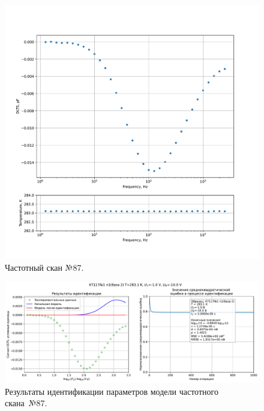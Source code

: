 \begin{figure}[!ht]
    \centering
    \includegraphics[width=1\textwidth]{../plots/КТ117№1_п1(база 2)_2500Гц-1Гц_1пФ_+10С_-1В-10В_200мВ_20мкс_шаг_0,1.pdf}
    \caption{Частотный скан №87.}
    \label{pic:frequency_scan_87}
\end{figure}

\begin{figure}[!ht]
    \centering
    \includegraphics[width=1\textwidth]{../plots/КТ117№1_п1(база 2)_2500Гц-1Гц_1пФ_+10С_-1В-10В_200мВ_20мкс_шаг_0,1_model.pdf}
    \caption{Результаты идентификации параметров модели частотного скана~№87.}
    \label{pic:frequency_scan_model87}
\end{figure}

\pagebreak


